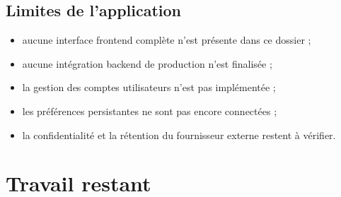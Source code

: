 \documentclass[11pt,a4paper]{article}
\begin{document}
\subsection{Limites de l'application}

\begin{itemize}[leftmargin=*]
    \item aucune interface frontend complète n'est présente dans ce dossier ;
    \item aucune intégration backend de production n'est finalisée ;
    \item la gestion des comptes utilisateurs n'est pas implémentée ;
    \item les préférences persistantes ne sont pas encore connectées ;
    \item la confidentialité et la rétention du fournisseur externe restent à
    vérifier.
\end{itemize}

\section{Travail restant}
\end{document}
